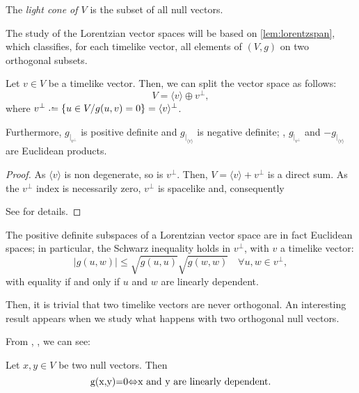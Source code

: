 \begin{definition}
	The \emph{light cone of $V$} is the subset of all null vectors.
\end{definition}

The study of the Lorentzian vector spaces will be based on \autoref{lem:lorentzspan}, which classifies, for each timelike vector, all elements of $(V,g)$ on two orthogonal subsets.

\begin{lemma}
	\label{lem:lorentzspan}
	Let $v \in V$ be a timelike vector. Then, we can split the vector space as follows:
	\[
		V = \langle v \rangle \oplus v^\perp,
	\]
	where $v^\perp \defeq \{u \in V / g(u,v) = 0\} = \langle v \rangle^\perp$.
	
	Furthermore, $g_{\mid_{v^\perp}}$ is positive definite and $g_{\mid_{\langle v \rangle}}$ is negative definite; \ie, $g_{\mid_{v^\perp}}$ and $-g_{\mid_{\langle v \rangle}}$ are Euclidean products.
\end{lemma}

\begin{proof}
	As $\langle v \rangle$ is non degenerate, so is $v^\perp$. Then, $V = \langle v \rangle + v^\perp$ is a direct sum. As the $v^\perp$ index is necessarily zero, $v^\perp$ is spacelike and, consequently
	
	See \cite[Lemma 5.26]{oneill83} for details.
\end{proof}

\begin{remark}\label{classic_Schwarz}
	The positive definite subspaces of a Lorentzian vector space are in fact Euclidean spaces; in particular, the Schwarz inequality holds in $v^\perp$, with $v$ a timelike vector:
    \begin{equation}
	    \label{eq:schwarz}
        \lvert g(u,w) \rvert \leq \sqrt{g(u,u)} \sqrt{g(w,w)} \quad \forall u,w \in v^\perp,
    \end{equation}
    with equality if and only if $u$ and $w$ are linearly dependent.
\end{remark}

Then, it is trivial that two timelike vectors are never orthogonal. An interesting result appears when we study what happens with two orthogonal null vectors.

From \cite[Cor. 1.1.5]{sachs77}, \cite[p. 155]{oneill83}, we can see:

\begin{proposition} Let $x,y \in V$ be two null vectors. Then
	\[
		$g(x,y)=0$ \Leftrightarrow $x$ \textrm{ and } $y$ \textrm{ are linearly dependent}.
	\]
\end{proposition}

